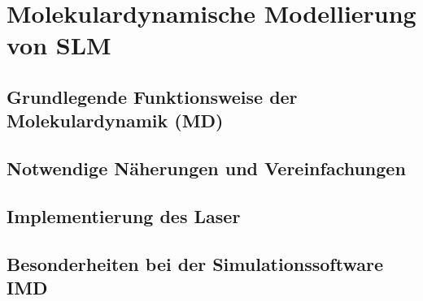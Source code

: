 \section{Molekulardynamische Modellierung von SLM}
	\subsection{Grundlegende Funktionsweise der Molekulardynamik (MD)}
	\subsection{Notwendige Näherungen und Vereinfachungen}
	\subsection{Implementierung des Laser}
	\subsection{Besonderheiten bei der Simulationssoftware IMD}
